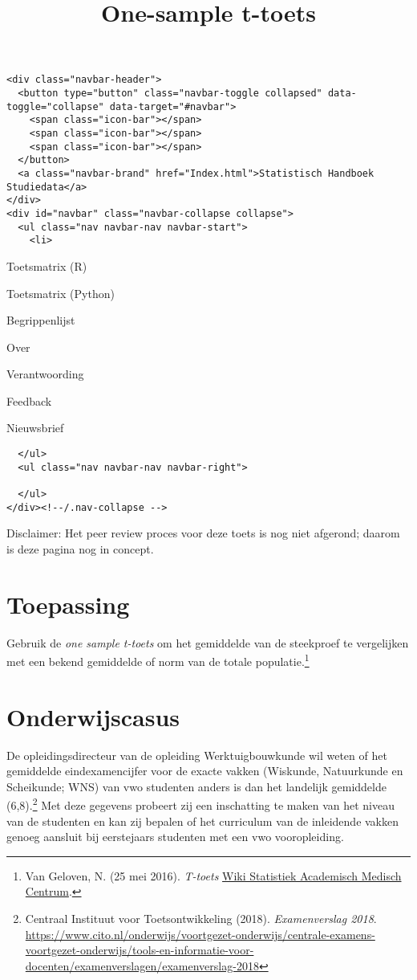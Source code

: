 \documentclass[
]{article}
\title{One-sample t-toets}
\author{}
\date{\vspace{-2.5em}}
\begin{document}
\maketitle

{
\setcounter{tocdepth}{2}
\tableofcontents
}
\begin{verbatim}
<div class="navbar-header">
  <button type="button" class="navbar-toggle collapsed" data-toggle="collapse" data-target="#navbar">
    <span class="icon-bar"></span>
    <span class="icon-bar"></span>
    <span class="icon-bar"></span>
  </button>
  <a class="navbar-brand" href="Index.html">Statistisch Handboek Studiedata</a>
</div>
<div id="navbar" class="navbar-collapse collapse">
  <ul class="nav navbar-nav navbar-start">
    <li>
\end{verbatim}

Toetsmatrix (R)

Toetsmatrix (Python)

Begrippenlijst

Over

Verantwoording

Feedback

Nieuwsbrief

\begin{verbatim}
  </ul>
  <ul class="nav navbar-nav navbar-right">

  </ul>
</div><!--/.nav-collapse -->
\end{verbatim}

Disclaimer: Het peer review proces voor deze toets is nog niet afgerond;
daarom is deze pagina nog in concept.

\hypertarget{toepassing}{%
\section{Toepassing}\label{toepassing}}

Gebruik de \emph{one sample t-toets} om het gemiddelde van de steekproef
te vergelijken met een bekend gemiddelde of norm van de totale
populatie.\footnote{Van Geloven, N. (25 mei 2016). \emph{T-toets}
  \href{https://wikistatistiek.amc.nl/index.php/T-toets\#one_sample_t-toets}{Wiki
  Statistiek Academisch Medisch Centrum}.}

\hypertarget{onderwijscasus}{%
\section{Onderwijscasus}\label{onderwijscasus}}

\leavevmode\hypertarget{casus}{}%
De opleidingsdirecteur van de opleiding Werktuigbouwkunde wil weten of
het gemiddelde eindexamencijfer voor de exacte vakken (Wiskunde,
Natuurkunde en Scheikunde; WNS) van vwo studenten anders is dan het
landelijk gemiddelde (6,8).\footnote{Centraal Instituut voor
  Toetsontwikkeling (2018). \emph{Examenverslag 2018}.
  \url{https://www.cito.nl/onderwijs/voortgezet-onderwijs/centrale-examens-voortgezet-onderwijs/tools-en-informatie-voor-docenten/examenverslagen/examenverslag-2018}}
Met deze gegevens probeert zij een inschatting te maken van het niveau
van de studenten en kan zij bepalen of het curriculum van de inleidende
vakken genoeg aansluit bij eerstejaars studenten met een vwo
vooropleiding.
\end{document}
